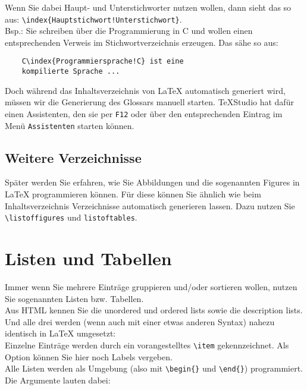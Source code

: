 Wenn Sie dabei Haupt- und Unterstichworter nutzen wollen, dann sieht das so aus: \verb|\index{Hauptstichwort!Unterstichwort}|.\\

Bsp.: Sie schreiben über die Programmierung in C und wollen einen entsprechenden Verweis im Stichwortverzeichnis erzeugen. Das sähe so aus:

\begin{verbatim}
	C\index{Programmiersprache!C} ist eine 
	kompilierte Sprache ...
\end{verbatim}

Doch während das Inhaltsverzeichnis von LaTeX automatisch generiert wird, müssen wir die Generierung des Glossars manuell starten. TeXStudio hat dafür einen Assistenten, den sie per \verb|F12| oder über den entsprechenden Eintrag im Menü \verb|Assistenten| starten können.

\subsection{Weitere Verzeichnisse}

Später werden Sie erfahren, wie Sie Abbildungen und die sogenannten Figures in LaTeX programmieren können. Für diese können Sie ähnlich wie beim Inhaltsverzeichnis Verzeichnisse automatisch generieren lassen. Dazu nutzen Sie \verb|\listoffigures| und \verb|listoftables|.

\section{Listen und Tabellen}

Immer wenn Sie mehrere Einträge gruppieren und/oder sortieren wollen, nutzen Sie sogenannten Listen bzw. Tabellen.\\

Aus HTML kennen Sie die unordered und ordered lists sowie die description lists. Und alle drei werden (wenn auch mit einer etwas anderen Syntax) nahezu identisch in LaTeX umgesetzt:\\

Einzelne Einträge werden durch ein vorangestelltes \verb|\item| gekennzeichnet. Als Option können Sie hier noch Labels vergeben.\\

Alle Listen werden als Umgebung (also mit \verb|\begin{}| und \verb|\end{}|) programmiert. Die Argumente lauten dabei:

